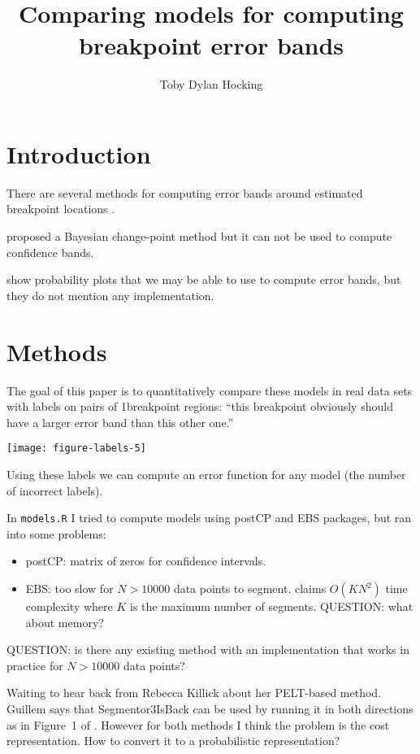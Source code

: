 \documentclass{article}
\begin{document}
\title{Comparing models for computing breakpoint error bands}
\author{Toby Dylan Hocking}
\maketitle

\section{Introduction}

There are several methods for computing error bands around estimated
breakpoint locations \citep{Rigaill, Luong}.

\citet{Erdman} proposed a Bayesian change-point method but it can not
be used to compute confidence bands.

\citet{Nam2012,Aston2012} show probability plots that we may be able
to use to compute error bands, but they do not mention any
implementation. 

\section{Methods}

The goal of this paper is to quantitatively compare these models in
real data sets with labels on pairs of 1breakpoint regions: ``this
breakpoint obviously should have a larger error band than this other
one.'' 

\texttt{[image: figure-labels-5]}

Using these labels we can compute an error function for any model (the
number of incorrect labels).

In \verb|models.R| I tried to compute models using postCP and EBS packages,
but ran into some problems:
\begin{itemize}
\item postCP: matrix of zeros for confidence intervals.
\item EBS: too slow for $N>10000$ data points to
  segment. \citet{Rigaill} claims $O(KN^2)$ time complexity where $K$
  is the maximum number of segments. QUESTION: what about memory?
\end{itemize}
QUESTION: is there any existing method with an implementation that
works in practice for $N>10000$ data points? 

Waiting to hear back from Rebecca Killick about her PELT-based
method. Guillem says that Segmentor3IsBack can be used by running it
in both directions as in Figure~1 of \citep{segmentor3arxiv}. However
for both methods I think the problem is the cost representation. How
to convert it to a probabilistic representation?
\end{document}
